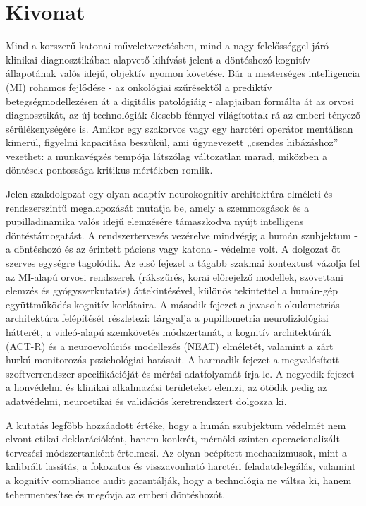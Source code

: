 \documentclass[12pt,a4paper,oneside]{book}
\begin{document}
\chapter*{\vspace*{-2cm}Kivonat}
\vspace*{-0.5cm}

 Mind a korszerű katonai műveletvezetésben, mind a nagy felelősséggel járó klinikai diagnosztikában alapvető kihívást jelent a döntéshozó kognitív állapotának valós idejű, objektív nyomon követése. Bár a mesterséges intelligencia (MI) rohamos fejlődése - az onkológiai szűrésektől a prediktív betegségmodellezésen át a digitális patológiáig - alapjaiban formálta át az orvosi diagnosztikát, az új technológiák élesebb fénnyel világítottak rá az emberi tényező sérülékenységére is. Amikor egy szakorvos vagy egy harctéri operátor mentálisan kimerül, figyelmi kapacitása beszűkül, ami úgynevezett „csendes hibázáshoz” vezethet: a munkavégzés tempója látszólag változatlan marad, miközben a döntések pontossága kritikus mértékben romlik.

Jelen szakdolgozat egy olyan adaptív neurokognitív architektúra elméleti és rendszerszintű megalapozását mutatja be, amely a szemmozgások és a pupilladinamika valós idejű elemzésére támaszkodva nyújt intelligens döntéstámogatást. A rendszertervezés vezérelve mindvégig a humán szubjektum - a döntéshozó és az érintett páciens vagy katona - védelme volt. A dolgozat öt szerves egységre tagolódik. Az első fejezet a tágabb szakmai kontextust vázolja fel az MI-alapú orvosi rendszerek (rákszűrés, korai előrejelző modellek, szövettani elemzés és gyógyszerkutatás) áttekintésével, különös tekintettel a humán-gép együttműködés kognitív korlátaira. A második fejezet a javasolt okulometriás architektúra felépítését részletezi: tárgyalja a pupillometria neurofiziológiai hátterét, a videó-alapú szemkövetés módszertanát, a kognitív architektúrák (ACT-R) és a neuroevolúciós modellezés (NEAT) elméletét, valamint a zárt hurkú monitorozás pszichológiai hatásait. A harmadik fejezet a megvalósított szoftverrendszer specifikációját és mérési adatfolyamát írja le. A negyedik fejezet a honvédelmi és klinikai alkalmazási területeket elemzi, az ötödik pedig az adatvédelmi, neuroetikai és validációs keretrendszert dolgozza ki.

A kutatás legfőbb hozzáadott értéke, hogy a humán szubjektum védelmét nem elvont etikai deklarációként, hanem konkrét, mérnöki szinten operacionalizált tervezési módszertanként értelmezi. Az olyan beépített mechanizmusok, mint a kalibrált lassítás, a fokozatos és visszavonható harctéri feladatdelegálás, valamint a kognitív compliance audit garantálják, hogy a technológia ne váltsa ki, hanem tehermentesítse és megóvja az emberi döntéshozót.
\end{document}
